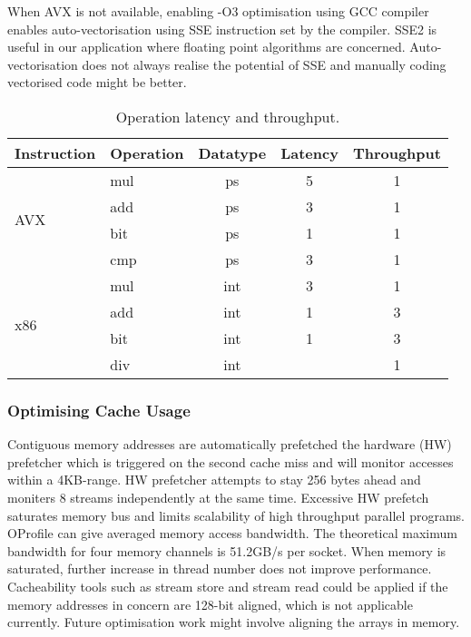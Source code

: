 \documentclass[journal]{IEEEtran}
\begin{document}
When AVX is not available, enabling -O3 optimisation using GCC compiler enables auto-vectorisation using SSE instruction set by the compiler. SSE2 is useful in our application where floating point algorithms are concerned. Auto-vectorisation does not always realise the potential of SSE and manually coding vectorised code might be better. \\

\begin{table}[h]
\centering

\begin{tabular}{l l c c c}
\hline
Instruction & Operation & Datatype & Latency & Throughput \\
\hline \hline
\multirow{4}{*}{AVX}
 & mul & ps 	& 5 	& 1 \\
 & add & ps 	& 3 	& 1 \\
 & bit & ps 	& 1 	& 1 \\
 & cmp & ps 	& 3 	& 1 \\
\hline

\multirow{4}{*}{x86}
 & mul & int 	& 3 	& 1 \\
 & add & int	& 1 	& 3 \\
 & bit & int 	& 1 	& 3 \\
 & div & int 	& \texttildelow 21 	& 1 \\
\hline

\end{tabular}
\caption{Operation latency and throughput.}\label{ops}
\end{table}

\subsubsection{Optimising Cache Usage}
Contiguous memory addresses are automatically prefetched the hardware (HW) prefetcher which is triggered on the second cache miss and will monitor accesses within a 4KB-range. HW prefetcher attempts to stay 256 bytes ahead and moniters 8 streams independently at the same time. Excessive HW prefetch saturates memory bus and limits scalability of high throughput parallel programs. OProfile can give averaged memory access bandwidth. The theoretical maximum bandwidth for four memory channels is 51.2GB/s per socket. When memory is saturated, further increase in thread number does not improve performance. \\
Cacheability tools such as stream store and stream read could be applied if the memory addresses in concern are 128-bit aligned, which is not applicable currently. Future optimisation work might involve aligning the arrays in memory. \\
\end{document}
